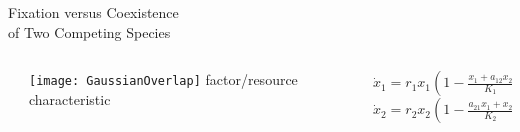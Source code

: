 \documentclass[dvipsnames]{beamer}
\begin{document}
\begin{frame}
\centering
{{\Huge Fixation versus Coexistence\\ 
\vspace{0.2cm}
of Two Competing Species}}
\begin{columns}
	\begin{column}{0.1cm}
		\hspace*{+0.2cm}
	\end{column}
	\begin{column}{5.9cm}
		\begin{center}
			\texttt{[image: GaussianOverlap]}
			factor/resource characteristic
		\end{center}
	\end{column}
	\begin{column}{5.1cm}
		$\dot{x}_1 = r_1 x_1 \left( 1 - \frac{x_1 + a_{12} x_2}{K_1} \right)$ \\
		$\dot{x}_2 = r_2 x_2 \left( 1 - \frac{a_{21} x_1 + x_2}{K_2} \right)$ \\
	\end{column}
\end{columns}
\end{frame}
\end{document}
